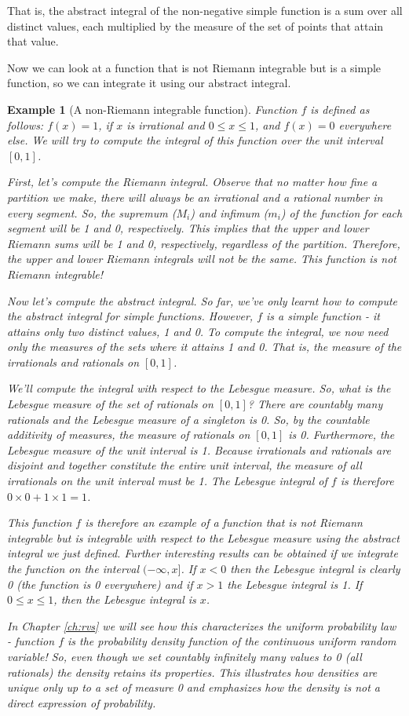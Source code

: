 \documentclass{book}
\theoremstyle{plain}%
\newtheorem{prototheorem}{Example}[section]
\newenvironment{cexample}
   {\colorlet{shadecolor}{gray!10}\begin{shaded}\begin{prototheorem}}
   {\end{prototheorem}\end{shaded}}
\theoremstyle{definition}
\begin{document}
That is, the abstract integral of the non-negative simple function is a sum over all distinct values, each multiplied by the measure of the set of points that attain that value.

Now we can look at a function that is not Riemann integrable but is a simple function, so we can integrate it using our abstract integral.

\begin{cexample}[A non-Riemann integrable function]
Function $f$ is defined as follows: $f(x) = 1$, if $x$ is irrational and $0 \leq x \leq 1$, and $f(x) = 0$ everywhere else. We will try to compute the integral of this function over the unit interval $[0,1]$.

First, let's compute the Riemann integral. Observe that no matter how fine a partition we make, there will always be an irrational and a rational number in every segment. So, the supremum ($M_i$) and infimum ($m_i$) of the function for each segment will be 1 and 0, respectively. This implies that the upper and lower Riemann sums will be 1 and 0, respectively, regardless of the partition. Therefore, the upper and lower Riemann integrals will not be the same. This function is not Riemann integrable!

Now let's compute the abstract integral. So far, we've only learnt how to compute the abstract integral for simple functions. However, $f$ is a simple function - it attains only two distinct values, 1 and 0. To compute the integral, we now need only the measures of the sets where it attains 1 and 0. That is, the measure of the irrationals and rationals on $[0,1]$.

We'll compute the integral with respect to the Lebesgue measure. So, what is the Lebesgue measure of the set of rationals on $[0,1]$? There are countably many rationals and the Lebesgue measure of a singleton is 0. So, by the countable additivity of measures, the measure of rationals on $[0,1]$ is 0. Furthermore, the Lebesgue measure of the unit interval is 1. Because irrationals and rationals are disjoint and together constitute the entire unit interval, the measure of all irrationals on the unit interval must be 1. The Lebesgue integral of $f$ is therefore $0 \times 0 + 1 \times 1 = 1$.

This function $f$ is therefore an example of a function that is not Riemann integrable but is integrable with respect to the Lebesgue measure using the abstract integral we just defined. Further interesting results can be obtained if we integrate the function on the interval $(-\infty, x]$. If $x < 0$ then the Lebesgue integral is clearly 0 (the function is 0 everywhere) and if $x > 1$ the Lebesgue integral is 1. If $0 \leq x \leq 1$, then the Lebesgue integral is $x$.

In Chapter \ref{ch:rvs} we will see how this characterizes the uniform probability law - function $f$ is the probability density function of the continuous uniform random variable! So, even though we set countably infinitely many values to 0 (all rationals) the density retains its properties. This illustrates how densities are unique only up to a set of measure 0 and emphasizes how the density is not a direct expression of probability.\label{ex:dirichlet}
\end{cexample}
\end{document}
